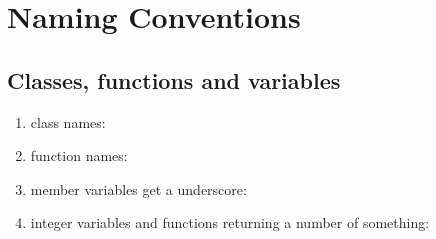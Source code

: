 \section{Naming Conventions}
\subsection{Classes, functions and variables}
\begin{enumerate}
\item class names: 
\item function names: 
\item member variables get a underscore: 
\item integer variables and functions returning a number of something: 
\end{enumerate}